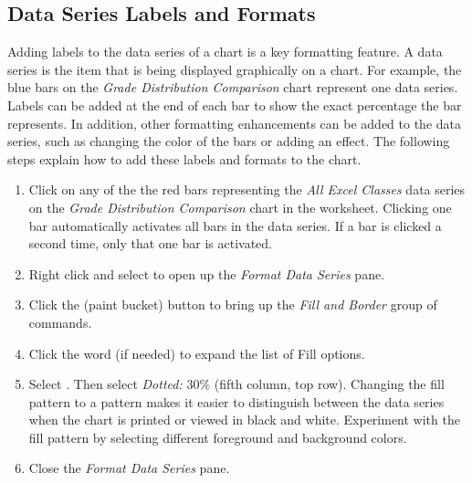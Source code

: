 \subsection{Data Series Labels and Formats}

Adding labels to the data series of a chart is a key formatting feature. A data series is the item that is being displayed graphically on a chart. For example, the blue bars on the \textit{Grade Distribution Comparison} chart represent one data series. Labels can be added at the end of each bar to show the exact percentage the bar represents. In addition, other formatting enhancements can be added to the data series, such as changing the color of the bars or adding an effect. The following steps explain how to add these labels and formats to the chart.

\begin{enumerate}
	\item Click on any of the the red bars representing the \textit{All Excel Classes} data series on the \textit{Grade Distribution Comparison} chart in the  worksheet. Clicking one bar automatically activates all bars in the data series. If a bar is clicked a second time, only that one bar is activated.
	\item Right click and select  to open up the \textit{Format Data Series} pane.
	\item Click the  (paint bucket) button to bring up the \textit{Fill and Border} group of commands.
	\item Click the word  (if needed) to expand the list of Fill options.
	\item Select . Then select \textit{Dotted: }$ 30\% $ (fifth column, top row). Changing the fill pattern to a pattern makes it easier to distinguish between the data series when the chart is printed or viewed in black and white. Experiment with the fill pattern by selecting different foreground and background colors.
	\item Close the \textit{Format Data Series} pane.
\end{enumerate}

